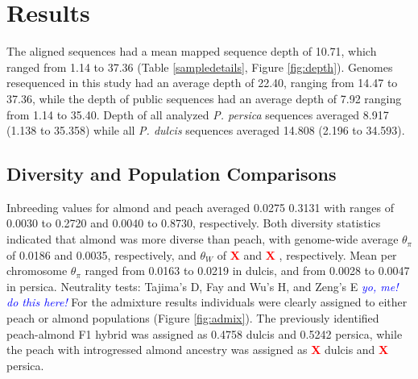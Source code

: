 \documentclass[12pt]{article}
\newcommand{\X}{\textcolor{red}{\bf X }}
\newcommand{\dv}[1]{\textcolor{blue}{\emph{#1}}}
\begin{document}
\section*{Results}

The aligned sequences had a mean mapped sequence depth of 10.71, which ranged from 1.14 to 37.36 (Table \ref{sampledetails}, Figure \ref{fig:depth}). %
%
Genomes resequenced in this study had an average depth of 22.40, ranging from 14.47 to 37.36, while the depth of public sequences had an average depth of 7.92 ranging from 1.14 to 35.40.
%
Depth of all analyzed \emph{P. persica} sequences averaged 8.917 (1.138 to 35.358) while all \emph{P. dulcis} sequences averaged 14.808 (2.196 to 34.593).
%
\subsection*{Diversity and Population Comparisons}

Inbreeding values for almond and peach averaged 0.0275 0.3131 with ranges of 0.0030 to 0.2720 and 0.0040 to 0.8730, respectively.
%
Both diversity statistics indicated that almond was more diverse than peach, with genome-wide average $\theta_{\pi}$ of 0.0186 and 0.0035, respectively, and $\theta_{W}$ of \X and \X, respectively.
%
Mean per chromosome $\theta_{\pi}$ ranged from 0.0163 to 0.0219 in dulcis, and from 0.0028 to 0.0047 in persica.
%
Neutrality tests: Tajima's D, Fay and Wu's H, and Zeng's E \dv{yo, me! do this here!}
%
For the admixture results individuals were clearly assigned to either peach or almond populations (Figure \ref{fig:admix}). 
%
The previously identified peach-almond F1 hybrid was assigned as 0.4758 dulcis and 0.5242 persica, while the peach with introgressed almond ancestry was assigned as \X dulcis and \X persica.
%
\end{document}
